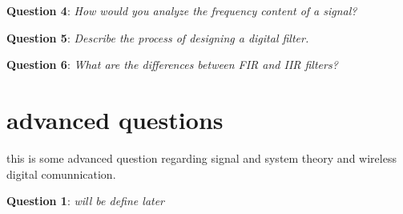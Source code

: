 \documentclass{article} %
\newcommand{\question}[2][]{\begin{flushleft}
    \textbf{Question #1}: \textit{#2}
\end{flushleft}}
\begin{document}
    \question[4]{How would you analyze the frequency content of a signal?}

    \question[5]{Describe the process of designing a digital filter.}

    \question[6]{What are the differences between FIR and IIR filters?}


\section{advanced questions}
    this is some advanced question regarding signal and system theory and wireless digital comunnication.
    
    \question[1]{will be define later} 
    
\end{document}
